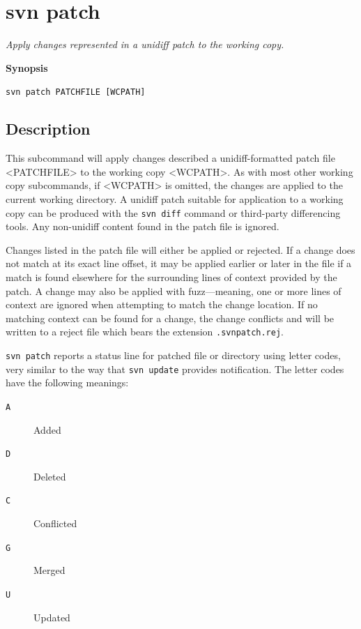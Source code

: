\section{svn patch}\label{svn.ref.svn.c.patch}

\emph{Apply changes represented in a unidiff patch to the working copy.}

\textbf{Synopsis}

\texttt{svn\ patch\ PATCHFILE\ {[}WCPATH{]}}

\subsection{Description}

This subcommand will apply changes described a unidiff-formatted patch
file \textless PATCHFILE\textgreater{} to the working copy
\textless WCPATH\textgreater. As with most other working copy
subcommands, if \textless WCPATH\textgreater{} is omitted, the changes
are applied to the current working directory. A unidiff patch suitable
for application to a working copy can be produced with the
\texttt{svn\ diff} command or third-party differencing tools. Any
non-unidiff content found in the patch file is ignored.

Changes listed in the patch file will either be applied or rejected. If
a change does not match at its exact line offset, it may be applied
earlier or later in the file if a match is found elsewhere for the
surrounding lines of context provided by the patch. A change may also be
applied with fuzz---meaning, one or more lines of context are ignored
when attempting to match the change location. If no matching context can
be found for a change, the change conflicts and will be written to a
reject file which bears the extension \texttt{.svnpatch.rej}.

\texttt{svn\ patch} reports a status line for patched file or directory
using letter codes, very similar to the way that \texttt{svn\ update}
provides notification. The letter codes have the following meanings:

\begin{description}
\item[\texttt{A}]
Added
\item[\texttt{D}]
Deleted
\item[\texttt{C}]
Conflicted
\item[\texttt{G}]
Merged
\item[\texttt{U}]
Updated
\end{description}


